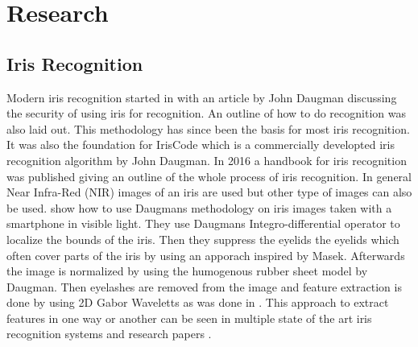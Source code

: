 \chapter{Research}
\label{cha:Research}

\section{Iris Recognition}
Modern iris recognition started in with an article by John Daugman \cite{Daugman1993} discussing the security of using iris for recognition. An outline of how to do recognition was also laid out. This methodology has since been the basis for most iris recognition. It was also the foundation for IrisCode which is a commercially developted iris recognition algorithm by John Daugman. In 2016 a handbook for iris recognition \cite{Bowyer2016b} was published giving an outline of the whole process of iris recognition. In general Near Infra-Red (NIR) images of an iris are used but other type of images can also be used.  \cite{Khan2017a} show how to use Daugmans methodology on iris images taken with a smartphone in visible light. They use Daugmans Integro-differential operator to localize the bounds of the iris. Then they suppress the eyelids the eyelids which often cover parts of the iris by using an apporach inspired by Masek. Afterwards the image is normalized by using the humogenous rubber sheet model by Daugman. Then eyelashes are removed from the image and feature extraction is done by using 2D Gabor Waveletts as was done in \cite{Daugman1993}. This approach to extract features in one way or another can be seen in multiple state of the art iris recognition systems and research papers \cite{Luhadiya2017a} \cite{Uka2017a} \cite{Kuehlkamp2016a}.